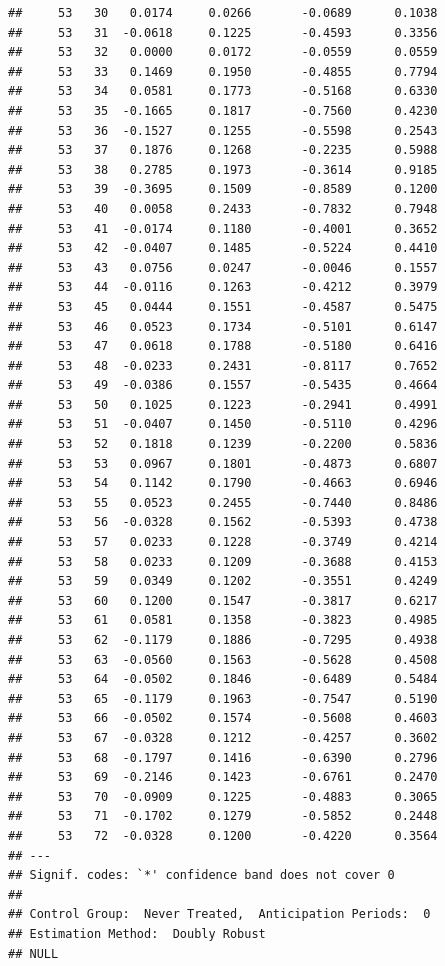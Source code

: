 \documentclass[
]{article}
\begin{document}
\begin{verbatim}
##     53   30   0.0174     0.0266       -0.0689      0.1038 
##     53   31  -0.0618     0.1225       -0.4593      0.3356 
##     53   32   0.0000     0.0172       -0.0559      0.0559 
##     53   33   0.1469     0.1950       -0.4855      0.7794 
##     53   34   0.0581     0.1773       -0.5168      0.6330 
##     53   35  -0.1665     0.1817       -0.7560      0.4230 
##     53   36  -0.1527     0.1255       -0.5598      0.2543 
##     53   37   0.1876     0.1268       -0.2235      0.5988 
##     53   38   0.2785     0.1973       -0.3614      0.9185 
##     53   39  -0.3695     0.1509       -0.8589      0.1200 
##     53   40   0.0058     0.2433       -0.7832      0.7948 
##     53   41  -0.0174     0.1180       -0.4001      0.3652 
##     53   42  -0.0407     0.1485       -0.5224      0.4410 
##     53   43   0.0756     0.0247       -0.0046      0.1557 
##     53   44  -0.0116     0.1263       -0.4212      0.3979 
##     53   45   0.0444     0.1551       -0.4587      0.5475 
##     53   46   0.0523     0.1734       -0.5101      0.6147 
##     53   47   0.0618     0.1788       -0.5180      0.6416 
##     53   48  -0.0233     0.2431       -0.8117      0.7652 
##     53   49  -0.0386     0.1557       -0.5435      0.4664 
##     53   50   0.1025     0.1223       -0.2941      0.4991 
##     53   51  -0.0407     0.1450       -0.5110      0.4296 
##     53   52   0.1818     0.1239       -0.2200      0.5836 
##     53   53   0.0967     0.1801       -0.4873      0.6807 
##     53   54   0.1142     0.1790       -0.4663      0.6946 
##     53   55   0.0523     0.2455       -0.7440      0.8486 
##     53   56  -0.0328     0.1562       -0.5393      0.4738 
##     53   57   0.0233     0.1228       -0.3749      0.4214 
##     53   58   0.0233     0.1209       -0.3688      0.4153 
##     53   59   0.0349     0.1202       -0.3551      0.4249 
##     53   60   0.1200     0.1547       -0.3817      0.6217 
##     53   61   0.0581     0.1358       -0.3823      0.4985 
##     53   62  -0.1179     0.1886       -0.7295      0.4938 
##     53   63  -0.0560     0.1563       -0.5628      0.4508 
##     53   64  -0.0502     0.1846       -0.6489      0.5484 
##     53   65  -0.1179     0.1963       -0.7547      0.5190 
##     53   66  -0.0502     0.1574       -0.5608      0.4603 
##     53   67  -0.0328     0.1212       -0.4257      0.3602 
##     53   68  -0.1797     0.1416       -0.6390      0.2796 
##     53   69  -0.2146     0.1423       -0.6761      0.2470 
##     53   70  -0.0909     0.1225       -0.4883      0.3065 
##     53   71  -0.1702     0.1279       -0.5852      0.2448 
##     53   72  -0.0328     0.1200       -0.4220      0.3564 
## ---
## Signif. codes: `*' confidence band does not cover 0
## 
## Control Group:  Never Treated,  Anticipation Periods:  0
## Estimation Method:  Doubly Robust
## NULL
\end{verbatim}
\end{document}
